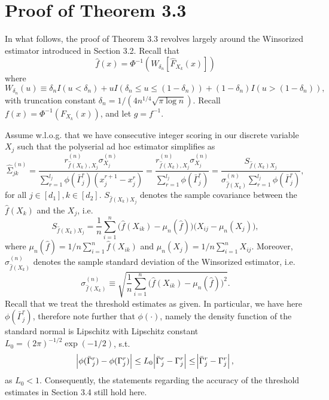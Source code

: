 \section{Proof of Theorem 3.3
 }\label{proof_concentration2}

In what follows, the proof of Theorem 3.3
revolves largely around the Winsorized estimator introduced in Section 3.2. %
Recall that \[\hat{f}(x) = \Phi^{-1}(W_{\delta_n}[\hat{F}_{X_k}(x)])\] where \[W_{\delta_n}(u) \equiv \delta_n I(u < \delta_n) + u I(\delta_n \leq u \leq (1-\delta_n)) + (1-\delta_n) I(u > (1-\delta_n)),\] with truncation constant $\delta_n = 1/(4n^{1/4}\sqrt{\pi\log n})$. Recall $f(x) = \Phi^{-1}(F_{X_k}(x))$, and let $g = f^{-1}$.

Assume w.l.o.g. that we have consecutive integer scoring in our discrete variable $X_j$ such that the polyserial ad hoc estimator simplifies as
\begin{equation}
    \hat{\Sigma}_{jk}^{(n)} = \frac{r^{(n)}_{\hat{f}(X_k),X_j} \sigma^{(n)}_{X_j}}{\sum_{r=1}^{l_{j}} \phi(\bar{\Gamma}_j^r)(x_j^{r+1} - x_j^r)} = \frac{r^{(n)}_{\hat{f}(X_k),X_j} \sigma^{(n)}_{X_j}}{\sum_{r=1}^{l_{j}} \phi(\bar{\Gamma}_j^r)} = \frac{S_{\hat{f}(X_k)X_j}}{\sigma^{(n)}_{\hat{f}(X_k)}\sum_{r=1}^{l_{j}} \phi(\bar{\Gamma}_j^r)},
\end{equation}
for all $j \in [d_1], k \in [d_2]$. $S_{\hat{f}(X_k)X_j}$ denotes the sample covariance between the $\hat{f}(X_k)$ and the $X_j$, i.e.
\begin{equation*}
    S_{\hat{f}(X_k)X_j} = \frac{1}{n}\sum_{i=1}^n \Big(\hat{f}(X_{ik}) - \mu_n(\hat{f})\Big)\Big(X_{ij} - \mu_n(X_j)\Big),
\end{equation*}
where $\mu_n(\hat{f}) = 1/n\sum_{i=1}^n\hat f(X_{ik})$ and $\mu_n(X_j) = 1/n\sum_{i=1}^n X_{ij}$. Moreover, $\sigma^{(n)}_{\hat{f}(X_k)}$ denotes the sample standard deviation of the Winsorized estimator, i.e.
\begin{equation*}
    \sigma^{(n)}_{\hat{f}(X_k)} \equiv \sqrt{\frac{1}{n}\sum_{i=1}^n \Big(\hat{f}(X_{ik}) - \mu_n(\hat{f})\Big)^2}.
\end{equation*}
Recall that we treat the threshold estimates as given. In particular, we have here $\phi(\bar{\Gamma}_j^r)$, therefore note further that $\phi(\cdot)$, namely the density function of the standard normal is Lipschitz with Lipschitz constant $L_0 = (2\pi)^{-1/2}\exp(-1/2)$, s.t.
\begin{equation*}
    \abs{\phi(\bar{\Gamma}^r_j) - \phi(\Gamma^r_j)} \leq L_0 \abs{\bar{\Gamma}^r_j - \Gamma^r_j} \leq \abs{\bar{\Gamma}^r_j - \Gamma^r_j},
\end{equation*}
as $L_0 < 1$. Consequently, the statements regarding the accuracy of the threshold estimates in Section 3.4 %
still hold here.

